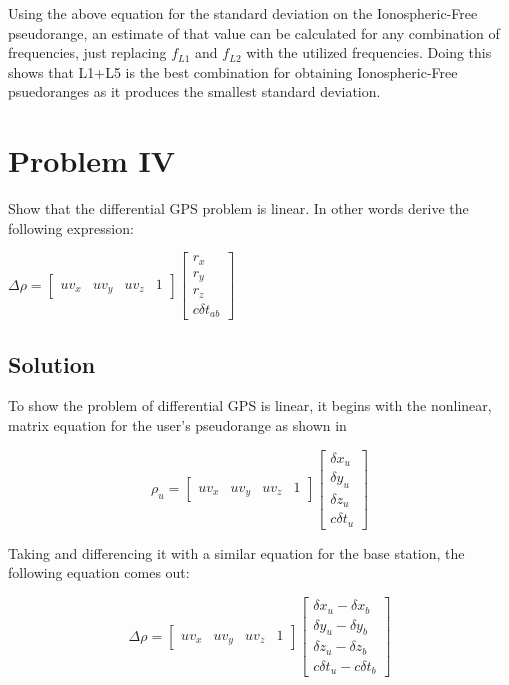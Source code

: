 \documentclass{article}
\begin{document}
Using the above equation for the standard deviation on the Ionospheric-Free pseudorange, an estimate of that value can be calculated for any combination of frequencies, just replacing $f_{L1}$ and $f_{L2}$ with the utilized frequencies.  Doing this shows that L1+L5 is the best combination for obtaining Ionospheric-Free psuedoranges as it produces the smallest standard deviation.

\section*{Problem IV}
Show that the differential GPS problem is linear. In other words derive the following
expression:
    \begin{center}
    $\Delta\rho=\begin{bmatrix}
        uv_x & uv_y & uv_z & 1
        \end{bmatrix}\begin{bmatrix}
        r_x\\r_y\\r_z\\c\delta t_{ab}
        \end{bmatrix}$
    \end{center}
\subsection*{Solution}

To show the problem of differential GPS is linear, it begins with the nonlinear, matrix equation for the user's pseudorange as shown in 

\begin{equation}
    \rho_u = \begin{bmatrix}
        uv_x & uv_y & uv_z & 1
        \end{bmatrix}\begin{bmatrix}
        \delta x_u\\\delta y_u\\\delta z_u\\c\delta t_u
        \end{bmatrix}\label{eq:psr_mat}
\end{equation}

Taking  and differencing it with a similar equation for the base station, the following equation comes out:

\begin{equation}
    \Delta\rho = \begin{bmatrix}
        uv_x & uv_y & uv_z & 1
        \end{bmatrix}\begin{bmatrix}
        \delta x_u - \delta x_b\\\delta y_u - \delta y_b\\\delta z_u - \delta z_b\\c\delta t_u - c\delta t_b
        \end{bmatrix}\label{eq:del_psr_mat}
\end{equation}
\end{document}
